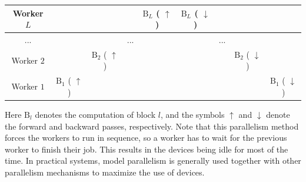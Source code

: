 \begin{itemize}
    \vspace{0.5em}
    \begin{center}
    \begingroup
    \renewcommand{\arraystretch}{1.6}
    \setlength{\tabcolsep}{2pt}
    {\small
    \begin{tabular}{c | c c c c c c c c}
    Worker $L$ & & & & \colorbox{blue!30}{$\mathrm{B}_L$} ({\color{blue} $\uparrow$}) & \colorbox{red!30}{$\mathrm{B}_L$} ({\color{red} $\downarrow$}) & & & \\ \hline
    ... & & & ... & & & ... & & \\ \hline
    Worker $2$ & & \colorbox{blue!30}{$\mathrm{B}_2$} ({\color{blue} $\uparrow$}) & & & & & \colorbox{red!30}{$\mathrm{B}_2$} ({\color{red} $\downarrow$}) & \\ \hline
    Worker $1$ & \colorbox{blue!30}{$\mathrm{B}_1$} ({\color{blue} $\uparrow$}) & & & & & & & \colorbox{red!30}{$\mathrm{B}_1$} ({\color{red} $\downarrow$})
    \end{tabular}
    }
    \endgroup
    \end{center}
    \vspace{0.5em}

    \noindent Here $\mathrm{B}_l$ denotes the computation of block $l$, and the symbols {\color{blue} $\uparrow$} and {\color{red} $\downarrow$} denote the forward and backward passes, respectively. Note that this parallelism method forces the workers to run in sequence, so a worker has to wait for the previous worker to finish their job. This results in the devices being idle for most of the time. In practical systems, model parallelism is generally used together with other parallelism mechanisms to maximize the use of devices.


\end{itemize}

